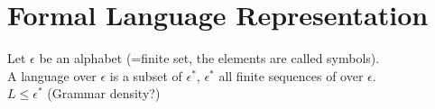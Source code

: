 \section{Formal Language Representation}
Let $\epsilon$ be an alphabet (=finite set, the elements are called symbols).\\
A language over $\epsilon$ is a subset of $\epsilon^*$, $\epsilon^*$ all finite sequences of over $\epsilon$.\\
$L \leq \epsilon^*$ (Grammar density?)
